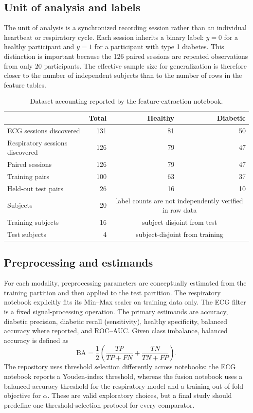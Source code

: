 \documentclass[11pt,a4paper]{article}
\begin{document}
\subsection{Unit of analysis and labels}
The unit of analysis is a synchronized recording session rather than an individual heartbeat or respiratory cycle. Each session inherits a binary label: $y=0$ for a healthy participant and $y=1$ for a participant with type 1 diabetes. This distinction is important because the 126 paired sessions are repeated observations from only 20 participants. The effective sample size for generalization is therefore closer to the number of independent subjects than to the number of rows in the feature tables.

\begin{table}[H]
\centering
\caption{Dataset accounting reported by the feature-extraction notebook.}
\label{tab:dataset}
\begin{tabular}{lrrr}
\toprule
 & \textbf{Total} & \textbf{Healthy} & \textbf{Diabetic}\\
\midrule
ECG sessions discovered & 131 & 81 & 50\\
Respiratory sessions discovered & 126 & 79 & 47\\
Paired sessions & 126 & 79 & 47\\
Training pairs & 100 & 63 & 37\\
Held-out test pairs & 26 & 16 & 10\\
Subjects & 20 & \multicolumn{2}{c}{label counts are not independently verified in raw data}\\
Training subjects & 16 & \multicolumn{2}{c}{subject-disjoint from test}\\
Test subjects & 4 & \multicolumn{2}{c}{subject-disjoint from training}\\
\bottomrule
\end{tabular}
\end{table}

\subsection{Preprocessing and estimands}
For each modality, preprocessing parameters are conceptually estimated from the training partition and then applied to the test partition. The respiratory notebook explicitly fits its Min--Max scaler on training data only. The ECG filter is a fixed signal-processing operation. The primary estimands are accuracy, diabetic precision, diabetic recall (sensitivity), healthy specificity, balanced accuracy where reported, and ROC--AUC. Given class imbalance, balanced accuracy is defined as
\begin{equation}
  \mathrm{BA}=\frac{1}{2}\left(\frac{TP}{TP+FN}+\frac{TN}{TN+FP}\right).
\end{equation}
The repository uses threshold selection differently across notebooks: the ECG notebook reports a Youden-index threshold, whereas the fusion notebook uses a balanced-accuracy threshold for the respiratory model and a training out-of-fold objective for $\alpha$. These are valid exploratory choices, but a final study should predefine one threshold-selection protocol for every comparator.
\end{document}
